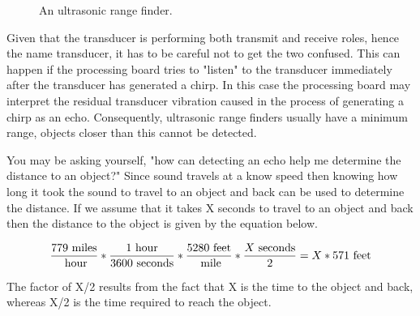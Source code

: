 \begin{figure}[ht]
\caption{An ultrasonic range finder.}
\label{fig:ultra}
\end{figure}

Given that the transducer is performing both transmit and receive
roles, hence the name transducer, it has to be careful not to get 
the two confused.  This can
happen if the processing board tries to "listen" to the transducer
immediately after the transducer has generated a chirp.  In this case
the processing board may interpret the residual transducer vibration
caused in the process of generating a chirp as an echo.  Consequently,
ultrasonic range finders 
usually have a minimum range, objects closer than this cannot be detected.

You may be asking yourself, "how can detecting an echo help me determine
the distance to an object?"  Since sound travels at a know speed
then knowing how long it took the sound to travel
to an object and back can be used to determine the distance.  If we assume
that it takes X seconds to travel to an object and back then the distance
to the object is given by the equation below.

$$	\frac{779 {\rm \ miles}}{{\rm \ hour}} * 
	\frac{1 {\rm \ hour}} {3600 {\rm \ seconds}} * 
	\frac{5280 {\rm \ feet}}{{\rm \ mile}} * 
	\frac{X {\rm \ seconds}}{2} =
	X * 571 {\rm \ feet} $$

The factor of X/2 results from the fact that X is the time to the 
object and back, whereas X/2 is the time required to reach the object. 




